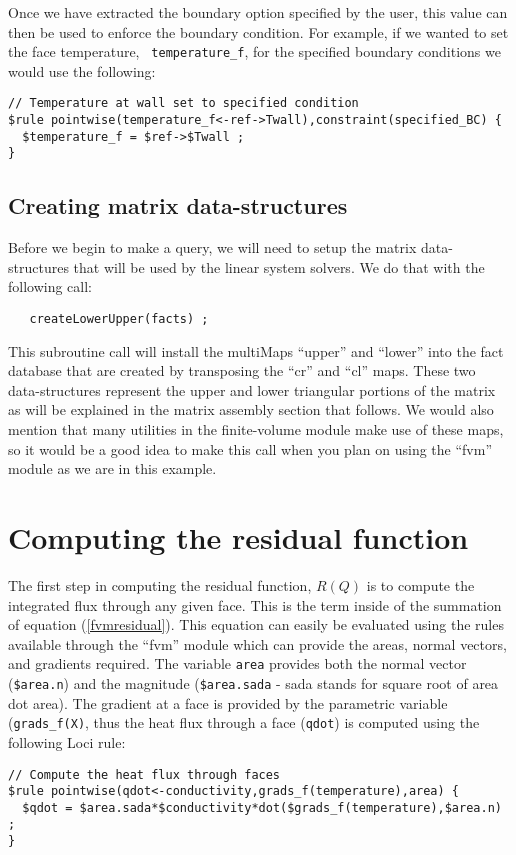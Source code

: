 \documentclass[10pt,epsf,letterpaper,twoside]{book}
\begin{document}
Once we have extracted the boundary option specified by the user, this
value can then be used to enforce the boundary condition.  For
example, if we wanted to set the face temperature, {\tt
  temperature\_f}, for the specified boundary conditions we would use
the following:
\begin{verbatim}
// Temperature at wall set to specified condition
$rule pointwise(temperature_f<-ref->Twall),constraint(specified_BC) {
  $temperature_f = $ref->$Twall ;
}
\end{verbatim}

\subsection{ Creating matrix data-structures}

Before we begin to make a query, we will need to setup the matrix data-structures that will be used by the linear system solvers.  We do that with the following call:
\begin{verbatim}
   createLowerUpper(facts) ;
\end{verbatim}
This subroutine call will install the multiMaps ``upper'' and
``lower'' into the fact database that are created by transposing the
``cr'' and ``cl'' maps.   These two data-structures represent the
upper and lower triangular portions of the matrix as will be explained
in the matrix assembly section that follows.  We would also mention
that many utilities in the finite-volume module make use of these
maps, so it would be a good idea to make this call when you plan on
using the ``fvm'' module as we are in this example.


\section{Computing the residual function}

The first step in computing the residual function, $R(Q)$ is to
compute the integrated flux through any given face.  This is the term
inside of the summation of equation (\ref{fvmresidual}).  This
equation can easily be evaluated using the rules available through the
``fvm'' module which can provide the areas, normal vectors, and
gradients required.  The variable {\tt area} provides both the normal
vector ({\tt \$area.n}) and the magnitude ({\tt \$area.sada} - sada
stands for square root of area dot area).  The gradient at a face is
provided by the parametric variable ({\tt grads\_f(X)}, thus the heat
flux through a face ({\tt qdot}) is computed using the following Loci rule:
\begin{verbatim}
// Compute the heat flux through faces
$rule pointwise(qdot<-conductivity,grads_f(temperature),area) {
  $qdot = $area.sada*$conductivity*dot($grads_f(temperature),$area.n) ;
}
\end{verbatim}
\end{document}
